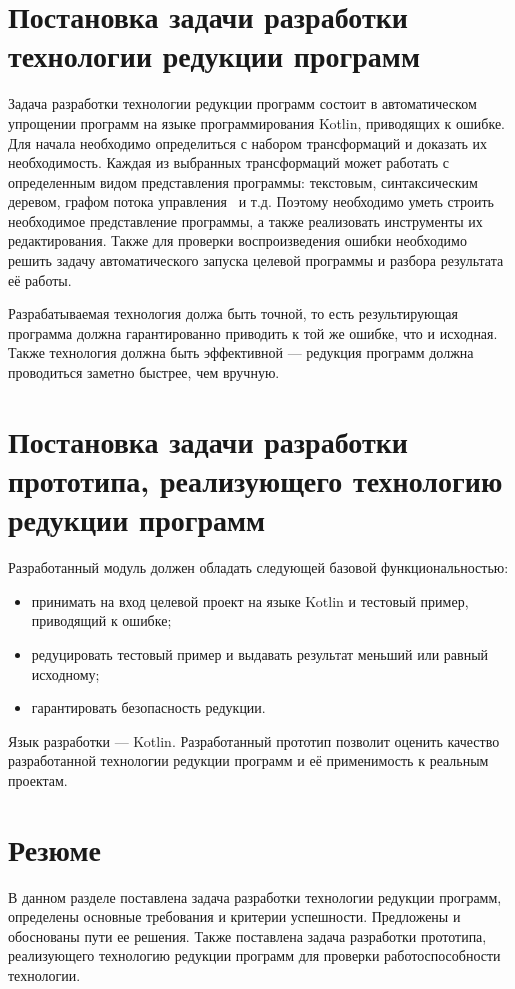 \section{Постановка задачи разработки технологии редукции программ}
Задача разработки технологии редукции программ состоит в автоматическом упрощении программ на языке программирования Kotlin, приводящих к ошибке. Для начала необходимо определиться с набором трансформаций и доказать их необходимость. Каждая из выбранных трансформаций может работать с определенным видом представления программы: текстовым, синтаксическим деревом, графом потока управления~\cite{harrold2005representation} и т.д. Поэтому необходимо уметь строить необходимое представление программы, а также реализовать инструменты их редактирования. Также для проверки воспроизведения ошибки необходимо решить задачу автоматического запуска целевой программы и разбора результата её работы.

Разрабатываемая технология должа быть точной, то есть результирующая программа должна гарантированно приводить к той же ошибке, что и исходная. Также технология должна быть эффективной --- редукция программ должна проводиться заметно быстрее, чем вручную. 

\section{Постановка задачи разработки прототипа, реализующего технологию редукции программ}
Разработанный модуль должен обладать следующей базовой функциональностью:
\begin{itemize}
\item принимать на вход целевой проект на языке Kotlin и тестовый пример, приводящий к ошибке;
\item редуцировать тестовый пример и выдавать результат меньший или равный исходному;
\item гарантировать безопасность редукции.
\end{itemize}
Язык разработки --- Kotlin. Разработанный прототип позволит оценить качество разработанной технологии редукции программ и её применимость к реальным проектам.

\section{Резюме}
В данном разделе поставлена задача разработки технологии редукции программ, определены основные требования и критерии успешности. Предложены и обоснованы пути ее решения. Также поставлена задача разработки прототипа, реализующего технологию редукции программ для проверки работоспособности технологии.